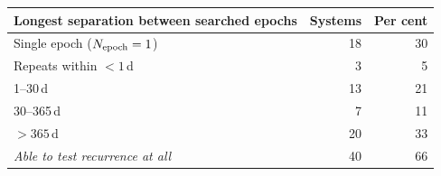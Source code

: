 \begin{tabular}{@{}lrr@{}}
\toprule
Longest separation between searched epochs & Systems & Per cent \\
\midrule
Single epoch ($N_{\rm epoch}=1$) & 18 & 30 \\
Repeats within $<1$\,d & 3 & 5 \\
1--30\,d & 13 & 21 \\
30--365\,d & 7 & 11 \\
$>365$\,d & 20 & 33 \\
\midrule
\emph{Able to test recurrence at all} & 40 & 66 \\
\bottomrule
\end{tabular}
